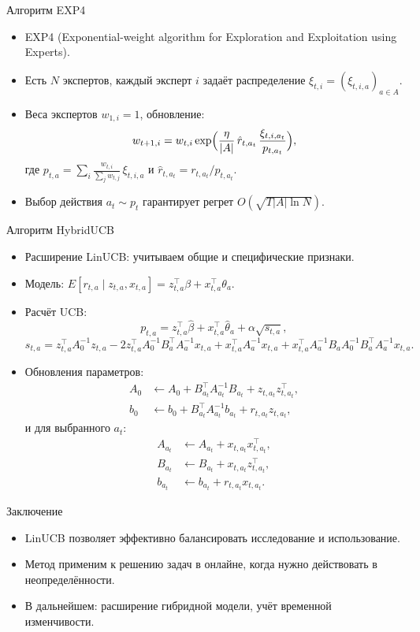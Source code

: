 \documentclass[10pt]{beamer}
\begin{document}
\begin{frame}{Алгоритм EXP4}
  \begin{itemize}
    \item EXP4 (Exponential-weight algorithm for Exploration and Exploitation using Experts).
    \item Есть $N$ экспертов, каждый эксперт $i$ задаёт распределение $\xi_{t,i}=(\xi_{t,i,a})_{a\in A}$.
    \item Веса экспертов $w_{1,i}=1$, обновление:
    \[ w_{t+1,i} = w_{t,i} \exp\Bigl(\frac{\eta}{|A|}\,\hat{r}_{t,a_t}\,\frac{\xi_{t,i,a_t}}{p_{t,a_t}}\Bigr), \]
    где $p_{t,a}=\sum_i \frac{w_{t,i}}{\sum_j w_{t,j}}\,\xi_{t,i,a}$ и $\hat{r}_{t,a_t}=r_{t,a_t}/p_{t,a_t}$.
    \item Выбор действия $a_t\sim p_t$ гарантирует регрет $O(\sqrt{T|A|\ln N})$.
  \end{itemize}
\end{frame}

\begin{frame}{Алгоритм HybridUCB}
  \begin{itemize}
    \item Расширение LinUCB: учитываем общие и специфические признаки.
    \item Модель: $E[r_{t,a}\mid z_{t,a},x_{t,a}] = z_{t,a}^\top\beta + x_{t,a}^\top\theta_a$.
    \item Расчёт UCB: 
    \[ p_{t,a} = z_{t,a}^\top\hat{\beta} + x_{t,a}^\top\hat{\theta}_a + \alpha\sqrt{s_{t,a}}, \]
    \[ s_{t,a} = z_{t,a}^\top A_0^{-1}z_{t,a} - 2z_{t,a}^\top A_0^{-1}B_a^\top A_a^{-1}x_{t,a} + x_{t,a}^\top A_a^{-1}x_{t,a} + x_{t,a}^\top A_a^{-1} B_a A_0^{-1} B_a^\top A_a^{-1} x_{t,a}. \]
    \item Обновления параметров:
    \begin{align*}
      A_0 &\leftarrow A_0 + B_{a_t}^\top A_{a_t}^{-1} B_{a_t} + z_{t,a_t}z_{t,a_t}^\top, \\
      b_0 &\leftarrow b_0 + B_{a_t}^\top A_{a_t}^{-1} b_{a_t} + r_{t,a_t}z_{t,a_t},
    \end{align*}
    и для выбранного $a_t$:
    \begin{align*}
      A_{a_t} &\leftarrow A_{a_t} + x_{t,a_t}x_{t,a_t}^\top, \\
      B_{a_t} &\leftarrow B_{a_t} + x_{t,a_t}z_{t,a_t}^\top, \\
      b_{a_t} &\leftarrow b_{a_t} + r_{t,a_t}x_{t,a_t}.
    \end{align*}
  \end{itemize}
\end{frame}

\begin{frame}{Заключение}
  \begin{itemize}
    \item LinUCB позволяет эффективно балансировать исследование и использование.
    \item Метод применим к решению задач в онлайне, когда нужно действовать в неопределённости.
    \item В дальнейшем: расширение гибридной модели, учёт временной изменчивости.
  \end{itemize}
\end{frame}
\end{document}

